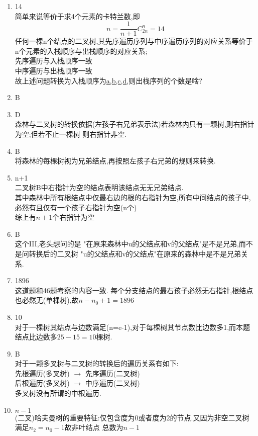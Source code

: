 \documentclass[12pt, a4paper, oneside, UTF8]{ctexbook}
\begin{document}
\begin{enumerate}[label=\arabic*.\textbf{答案}:]
    \item 14 \\
    简单来说等价于求4个元素的卡特兰数,即
    $$
    n = \frac{1}{n+1}C_{2n}^{n} = 14
    $$ 
    任何一棵n个结点的二叉树,其先序遍历序列与中序遍历序列的对应关系等价于n个元素的入栈顺序与出栈顺序的对应关系; \\
    先序遍历与入栈顺序一致 \\
    中序遍历与出栈顺序一致 \\
    故上述问题转换为入栈顺序为\underline{a,b,c,d},则出栈序列的个数是啥?
    \item B
    \item D \\
    森林与二叉树的转换依据(左孩子右兄弟表示法)若森林内只有一颗树,则右指针为空;但若不止一棵树
    则右指针非空. 
    \item B \\
    将森林的每棵树视为兄弟结点,再按照左孩子右兄弟的规则来转换.
    \item n+1 \\
    二叉树B中右指针为空的结点表明该结点无无兄弟结点. \\
    其中森林中所有根结点中仅最右边的根的右指针为空,所有中间结点的孩子中,必然有且仅有一个孩子右指针为空(n个) \\
    综上有$n+1$个右指针为空 
    \item B \\
    这个III,老头想问的是 "在原来森林中u的父结点和v的父结点"是不是兄弟,而不是问转换后的二叉树
    "u的父结点和v的父结点"在原来的森林中是不是兄弟关系.
    \item 1896 \\
    这道题和46题考察的内容一致. 每个分支结点的最右孩子必然无右指针,根结点也必然无(单棵树),故$n-n_0+1=1896$
    \item 10 \\
    对于一棵树其结点与边数满足(n=e-1),对于每棵树其节点数比边数多1,而本题结点比边数多$25-15=10$棵树.
    \item B \\
    对于一颗多叉树与二叉树的转换后的遍历关系有如下: \\
    先根遍历(多叉树) $\rightarrow$ 先序遍历(二叉树) \\
    后根遍历(多叉树) $\rightarrow$ 中序遍历(二叉树) \\
    多叉树没有所谓的中根遍历. 
    \item $n-1$ \\
    (二叉)哈夫曼树的重要特征:仅包含度为0或者度为2的节点.又因为非空二叉树满足$n_2=n_0-1$故非叶结点
    总数为$n-1$

\end{enumerate}
\end{document}
